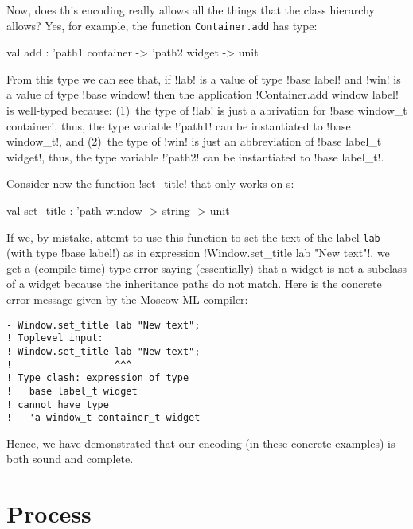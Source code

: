 \documentclass[workingdraft]{usetex-v1}
\begin{document}
Now, does this encoding really allows all the things that the class
hierarchy allows?  Yes, for example, the function
\texttt{Container.add} has type:
\begin{SMLcode}
val add : 'path1 container -> 'path2 widget 
                                    -> unit
\end{SMLcode}
From this type we can see that, if !lab! is a value of type 
%
!base label! 
% 
and !win! is a value of type !base window! then
the application
%
!Container.add window label!
%
is well-typed because: (1)~the type of !lab! is just a abrivation for 
%
!base window_t container!,
%
thus, the type variable !'path1! can be instantiated to 
%
!base window_t!,
% 
and (2)~the type of !win! is just an abbreviation of 
%
!base label_t widget!,
%
thus, the type variable !'path2! can be instantiated to 
%
!base label_t!.

Consider now the function !set_title! that only works on s:
\begin{SMLcode}
val set_title : 'path window -> string 
                               -> unit
\end{SMLcode}
If we, by mistake, attemt to use this function to set the text of the
label \texttt{lab} (with type !base label!) as in expression
%
!Window.set_title lab "New text"!, 
%
we get a (compile-time) type error saying (essentially) that a
 widget is not a subclass of a 
widget because the inheritance paths do not match.  Here is the
concrete error message given by the Moscow ML compiler:
\begin{verbatim}
- Window.set_title lab "New text";
! Toplevel input:
! Window.set_title lab "New text";
!                  ^^^
! Type clash: expression of type
!   base label_t widget
! cannot have type
!   'a window_t container_t widget
\end{verbatim}

Hence, we have demonstrated that our encoding (in these concrete
examples) is both sound and complete.




\section{Process}
\label{sec:process}
\end{document}
